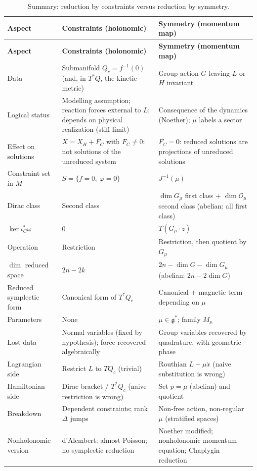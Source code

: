 \documentclass[11pt,a4paper]{article}
\numberwithin{equation}{section}
\theoremstyle{plain}
\theoremstyle{definition}
\theoremstyle{remark}
\newcommand{\frakg}{\mathfrak{g}}
\begin{document}
\begin{small}
\renewcommand{\arraystretch}{1.25}
\setlength{\tabcolsep}{4pt}
\begin{longtable}{@{}>{\raggedright\arraybackslash}p{2.5cm}>{\raggedright\arraybackslash}p{5.5cm}>{\raggedright\arraybackslash}p{5.5cm}@{}}
\caption{Summary: reduction by constraints versus reduction by symmetry.}\label{tab:summary}\\
\toprule
\textbf{Aspect} & \textbf{Constraints (holonomic)} & \textbf{Symmetry (momentum map)}\\
\midrule
\endfirsthead
\toprule
\textbf{Aspect} & \textbf{Constraints (holonomic)} & \textbf{Symmetry (momentum map)}\\
\midrule
\endhead
\bottomrule
\endfoot
Data & Submanifold $Q_c=f^{-1}(0)$ (and, in $T^*Q$, the kinetic metric) & Group action $G$ leaving $L$ or $H$ invariant\\
Logical status & Modelling assumption; reaction forces external to $L$; depends on physical realization (stiff limit) & Consequence of the dynamics (Noether); $\mu$ labels a sector\\
Effect on solutions & $X=X_H+F_C$ with $F_C\ne0$: not solutions of the unreduced system & $F_C=0$: reduced solutions are projections of unreduced solutions\\
Constraint set in $M$ & $S=\{f=0,\ \varphi=0\}$ & $J^{-1}(\mu)$\\
Dirac class & Second class & $\dim G_\mu$ first class $+$ $\dim\mathcal O_\mu$ second class (abelian: all first class)\\
$\ker\iota_C^*\omega$ & $0$ & $T(G_\mu\cdot z)$\\
Operation & Restriction & Restriction, then quotient by $G_\mu$\\
$\dim$ reduced space & $2n-2k$ & $2n-\dim G-\dim G_\mu$ (abelian: $2n-2\dim G$)\\
Reduced symplectic form & Canonical form of $T^*Q_c$ & Canonical $+$ magnetic term depending on $\mu$\\
Parameters & None & $\mu\in\frakg^*$; family $M_\mu$\\
Lost data & Normal variables (fixed by hypothesis); force recovered algebraically & Group variables recovered by quadrature, with geometric phase\\
Lagrangian side & Restrict $L$ to $TQ_c$ (trivial) & Routhian $L-\mu\dot x$ (naive substitution is wrong)\\
Hamiltonian side & Dirac bracket / $T^*Q_c$ (naive restriction is wrong) & Set $p=\mu$ (abelian) and quotient\\
Breakdown & Dependent constraints; rank $\Delta$ jumps & Non-free action, non-regular $\mu$ (stratified spaces)\\
Nonholonomic version & d'Alembert; almost-Poisson; no symplectic reduction & Noether modified; nonholonomic momentum equation; Chaplygin reduction\\
\end{longtable}
\end{small}
\end{document}
